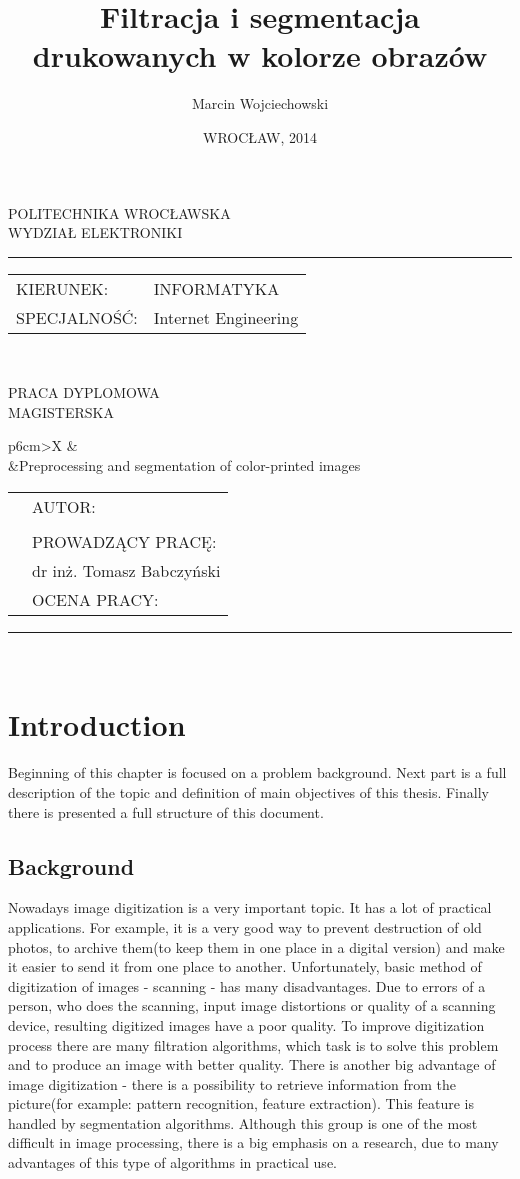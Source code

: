 \documentclass[a4paper,onecolumn,oneside,12pt]{memoir}
\makeatletter
\newcommand\uczelnia[1]{\renewcommand\@uczelnia{#1}}
\newcommand\@uczelnia{}
\newcommand\wydzial[1]{\renewcommand\@wydzial{#1}}
\newcommand\@wydzial{}
\newcommand\kierunek[1]{\renewcommand\@kierunek{#1}}
\newcommand\@kierunek{}
\newcommand\specjalnosc[1]{\renewcommand\@specjalnosc{#1}}
\newcommand\@specjalnosc{}
\newcommand\titleEN[1]{\renewcommand\@titleEN{#1}}
\newcommand\@titleEN{}
\newcommand\titleShort[1]{\renewcommand\@titleShort{#1}}
\newcommand\@titleShort{}
\newcommand\promotor[1]{\renewcommand\@promotor{#1}}
\newcommand\@promotor{}
\def\maketitle{%
  \null
  \pagestyle{empty}%
	{\centering\vspace{-1cm}
		{\fontsize{22pt}{24pt}\selectfont \@uczelnia}\\[0.4cm]
		{\fontsize{22pt}{24pt}\selectfont \@wydzial }\\[0.5cm]
		\hrule \vspace*{0.7cm}
	}
{\flushleft\fontsize{14pt}{16pt}\selectfont%
\begin{tabular}{ll}
KIERUNEK: & \@kierunek\\
SPECJALNOŚĆ: & \@specjalnosc\\
\end{tabular}\\[1.3cm]
}
{\centering
\vskip 1cm
{\fontsize{24pt}{26pt}\selectfont PRACA DYPLOMOWA}\\[0.5cm]
{\fontsize{24pt}{26pt}\selectfont MAGISTERSKA}\\[2cm]
\vskip 0.8cm
}
%
\begin{tabularx}{\linewidth}{p{6cm}>{\centering\arraybackslash}X}
		&{\fontsize{16pt}{18pt}\selectfont \@title}\\[5mm] 	%
		&{\fontsize{16pt}{18pt}\selectfont \@titleEN}\\[10mm] %
\end{tabularx}
\vfill
\begin{tabularx}{\linewidth}{p{6cm}l}
		&{\fontsize{16pt}{18pt}\selectfont AUTOR:}\\[5mm]
		&{\fontsize{14pt}{16pt}\selectfont \@author}\\[10mm]
		&{\fontsize{16pt}{18pt}\selectfont PROWADZĄCY PRACĘ:}\\[5mm]
		&{\fontsize{14pt}{16pt}\selectfont \@promotor}\\[10mm]
		&{\fontsize{16pt}{18pt}\selectfont OCENA PRACY:}\\[20mm]
	\end{tabularx}
\hrule\vspace*{0.3cm}
{\centering
{\fontsize{16pt}{18pt}\selectfont \@date}\\[0cm]
}
\normalfont
 \cleardoublepage
}
\makeatother
\begin{document}
\title{Filtracja i segmentacja drukowanych w kolorze obrazów}
\titleShort{Filtracja i segmentacja drukowanych w kolorze obrazów}
\titleEN{Preprocessing and segmentation of color-printed images}
\author{Marcin Wojciechowski}
\uczelnia{POLITECHNIKA WROCŁAWSKA}
\wydzial{WYDZIAŁ ELEKTRONIKI}
\kierunek{INFORMATYKA}
\specjalnosc{Internet Engineering}
\promotor{dr inż. Tomasz Babczyński}
\date{WROCŁAW, 2014}
\maketitle

\pagestyle{outer}
\mbox{}
\tableofcontents* 
\newpage

\chapter{Introduction}

Beginning of this chapter is focused on a problem background. Next part is a 
full description of the topic and definition of main objectives of this thesis.
Finally there is presented a full structure of this document.

\section{Background}

Nowadays image digitization is a very important topic. It has a lot of practical applications.
For example, it is a very good way to prevent destruction of old photos,
to archive them(to keep them in one place in a digital version) and make it easier to 
send it from one place to another. Unfortunately, basic method of digitization of
images - scanning - has many disadvantages. Due to errors of a person, who does the
scanning, input image distortions or quality of a scanning device, resulting digitized images 
have a poor quality. To improve digitization process there are many filtration algorithms,
which task is to solve this problem and to produce an image with better quality. There
is another big advantage of image digitization - there is a possibility
to retrieve information from the picture(for example: pattern recognition, feature extraction).
This feature is handled by segmentation algorithms. Although this group is one of the most 
difficult in image processing, there is a big emphasis on a research, due to many advantages
of this type of algorithms in practical use.
\end{document}
